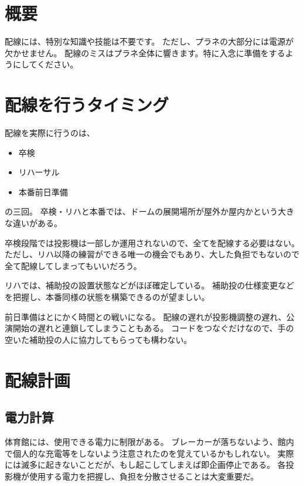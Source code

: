 \documentclass[letterpaper,10pt,dvipdfmx]{sphinxmanual}
\begin{document}
\section{概要}
\label{\detokenize{haisen:id2}}
配線には、特別な知識や技能は不要です。
ただし、プラネの大部分には電源が欠かせません。
配線のミスはプラネ全体に響きます。特に入念に準備をするようにしてください。


\section{配線を行うタイミング}
\label{\detokenize{haisen:id3}}
配線を実際に行うのは、
\begin{itemize}
\item {} 
卒検

\item {} 
リハーサル

\item {} 
本番前日準備

\end{itemize}

の三回。
卒検・リハと本番では、ドームの展開場所が屋外か屋内かという大きな違いがある。

卒検段階では投影機は一部しか運用されないので、全てを配線する必要はない。
ただし、リハ以降の練習ができる唯一の機会でもあり、大した負担でもないので全て配線してしまってもいいだろう。

リハでは、補助投の設置状態などがほぼ確定している。
補助投の仕様変更などを把握し、本番同様の状態を構築できるのが望ましい。

前日準備はとにかく時間との戦いになる。
配線の遅れが投影機調整の遅れ、公演開始の遅れと連鎖してしまうこともある。
コードをつなぐだけなので、手の空いた補助投の人に協力してもらっても構わない。


\section{配線計画}
\label{\detokenize{haisen:id4}}

\subsection{電力計算}
\label{\detokenize{haisen:id5}}
体育館には、使用できる電力に制限がある。
ブレーカーが落ちないよう、館内で個人的な充電等をしないよう注意されたのを覚えているかもしれない。
実際には滅多に起きないことだが、もし起こしてしまえば即企画停止である。
各投影機が使用する電力を把握し、負担を分散させることは大変重要だ。
\end{document}
